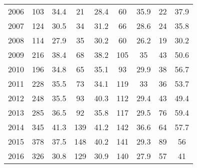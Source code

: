 \begin{table}[htbp]
\begin{tabular}{l*{8}{c}}
2006      &      103&     34.4&       21&     28.4&       60&     35.9&       22&     37.9\\
2007      &      124&     30.5&       34&     31.2&       66&     28.6&       24&     35.8\\
2008      &      114&     27.9&       35&     30.2&       60&     26.2&       19&     30.2\\
2009      &      216&     38.4&       68&     38.2&      105&       35&       43&     50.6\\
2010      &      196&     34.8&       65&     35.1&       93&     29.9&       38&     56.7\\
2011      &      228&     35.5&       73&     34.1&      119&       33&       36&     53.7\\
2012      &      248&     35.5&       93&     40.3&      112&     29.4&       43&     49.4\\
2013      &      285&     36.5&       92&     35.8&      117&     29.5&       76&     59.4\\
2014      &      345&     41.3&      139&     41.2&      142&     36.6&       64&     57.7\\
2015      &      378&     37.5&      148&     40.2&      141&     29.3&       89&       56\\
2016      &      326&     30.8&      129&     30.9&      140&     27.9&       57&       41\\
\hline\hline
\end{tabular}
\end{table}
